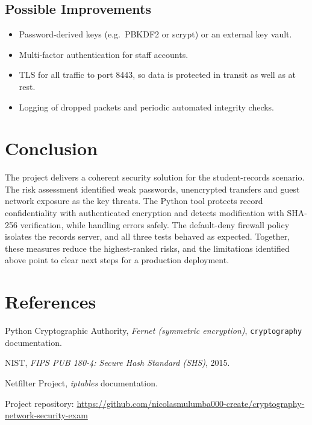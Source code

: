 \documentclass[11pt,a4paper]{article}
\begin{document}
\subsection{Possible Improvements}
\begin{itemize}[leftmargin=*]
  \item Password-derived keys (e.g.\ PBKDF2 or scrypt) or an external key vault.
  \item Multi-factor authentication for staff accounts.
  \item TLS for all traffic to port 8443, so data is protected in transit as well as at rest.
  \item Logging of dropped packets and periodic automated integrity checks.
\end{itemize}

\section{Conclusion}
The project delivers a coherent security solution for the student-records scenario.
The risk assessment identified weak passwords, unencrypted transfers and guest
network exposure as the key threats. The Python tool protects record
confidentiality with authenticated encryption and detects modification with SHA-256
verification, while handling errors safely. The default-deny firewall policy
isolates the records server, and all three tests behaved as expected. Together,
these measures reduce the highest-ranked risks, and the limitations identified above
point to clear next steps for a production deployment.

\section*{References}
\begin{enumerate}[label={[\arabic*]},leftmargin=*]
  \item Python Cryptographic Authority, \textit{Fernet (symmetric encryption)},
        \texttt{cryptography} documentation.
  \item NIST, \textit{FIPS PUB 180-4: Secure Hash Standard (SHS)}, 2015.
  \item Netfilter Project, \textit{iptables} documentation.
  \item Project repository:
        \url{https://github.com/nicolasmulumba000-create/cryptography-network-security-exam}
\end{enumerate}
\end{document}

